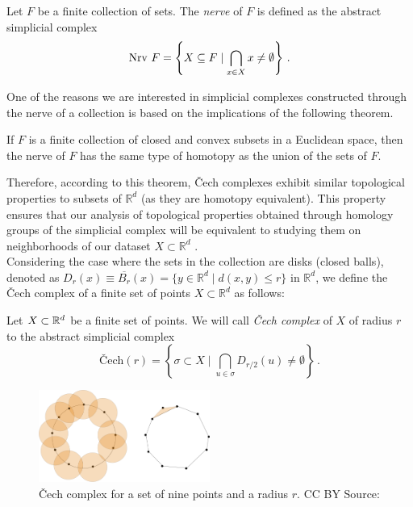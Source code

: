 \documentclass[../main.tex]{subfiles}
\begin{document}
\begin{definition}
Let $F$ be a finite collection of sets. The \emph{nerve} of $F$ is defined as the abstract simplicial complex
\[
{\rm Nrv}\ F= \left\{ X \subseteq F \mid \bigcap_{x\in X} x \neq \emptyset \right\}\,.
\]
\end{definition}

One of the reasons we are interested in simplicial complexes constructed through the nerve of a collection is based on the implications of the following theorem.

\begin{theorem}
If $F$ is a finite collection of closed and convex subsets in a Euclidean space, then the nerve of $F$ has the same type of homotopy as the union of the sets of $F$.
\end{theorem}
Therefore, according to this theorem, \v{C}ech complexes exhibit similar topological properties to subsets of $\mathbb{R}^d$ (as they are homotopy equivalent). This property ensures that our analysis of topological properties obtained through homology groups of the simplicial complex will be equivalent to studying them on neighborhoods of our dataset $X \subset \mathbb{R}^d$ \cite{doherty_cech_2018}.\\

Considering the case where the sets in the collection are disks (closed balls), denoted as $D_r(x) \equiv \overline{B_r}(x) = \{y\in \mathbb{R}^d \mid d(x, y) \leq r\}$ in $\mathbb{R}^d$, we define the \v{C}ech complex of a finite set of points $X \subset \mathbb{R}^d$ as follows:

\begin{definition}
Let $X\subset \mathbb{R}^d$ be a finite set of points. We will call \emph{\v{C}ech complex} of $X$ of radius $r$ to the abstract simplicial complex
\[
\text{\v{C}ech}(r)=\left\{\sigma \subset X \mid \bigcap_{u \in \sigma} D_{r/2}(u)\neq \emptyset \right\}\,.
\]
\end{definition}

\begin{figure}[!ht]
\centering
\includegraphics[width=0.5\textwidth]{figures/bg/Cech.png} 
\caption{\v{C}ech complex for a set of nine points and a radius $r$. CC BY Source: \cite{proboscidearubber15_cech_2023}}
\label{fig:cech}
\end{figure}
\end{document}
